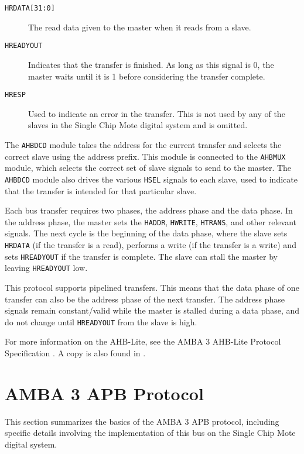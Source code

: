 \begin{description}
	\item[\texttt{HRDATA[31:0]}] The read data given to the master when it reads from a slave.
	\item[\texttt{HREADYOUT}] Indicates that the transfer is finished. As long as this signal is 0, the master waits until it is 1 before considering the transfer complete.
	\item[\texttt{HRESP}] Used to indicate an error in the transfer. This is not used by any of the slaves in the Single Chip Mote digital system and is omitted.
\end{description}

The \texttt{AHBDCD} module takes the address for the current transfer and selects the correct slave using the address prefix. This module is connected to the \texttt{AHBMUX} module, which selects the correct set of slave signals to send to the master. The \texttt{AHBDCD} module also drives the various \texttt{HSEL} signals to each slave, used to indicate that the transfer is intended for that particular slave.

Each bus transfer requires two phases, the address phase and the data phase. In the address phase, the master sets the \texttt{HADDR}, \texttt{HWRITE}, \texttt{HTRANS}, and other relevant signals. The next cycle is the beginning of the data phase, where the slave sets \texttt{HRDATA} (if the transfer is a read), performs a write (if the transfer is a write) and sets \texttt{HREADYOUT} if the transfer is complete. The slave can stall the master by leaving \texttt{HREADYOUT} low.

This protocol supports pipelined transfers. This means that the data phase of one transfer can also be the address phase of the next transfer. The address phase signals remain constant/valid while the master is stalled during a data phase, and do not change until \texttt{HREADYOUT} from the slave is high.

For more information on the AHB-Lite, see the AMBA 3 AHB-Lite Protocol Specification \cite{ahb-lite-spec}. A copy is also found in .

\section{AMBA 3 APB Protocol}
This section summarizes the basics of the AMBA 3 APB protocol, including specific details involving the implementation of this bus on the Single Chip Mote digital system.


